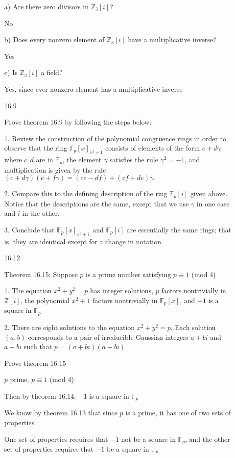 \documentclass[12pt]{article}
\begin{document}
\begin{itemize}
a) Are there zero divisors in $\mathbb{Z}_3[i]$?

No

b) Does every nonzero element of $\mathbb{Z}_3[i]$ have a multiplicative inverse?

Yes

c) Is $\mathbb{Z}_3[i]$ a field?

Yes, since ever nonzero element has a multiplicative inverse

\newpage
\item[16.9]

Prove theorem 16.9 by following the steps below:

1. Review the construction of the polynomial congruence rings in order to observe that the ring $\mathbb{F}_p[x]_{x^2 + 1}$ consists of elements of the form $c+d\gamma$ where $c, d$ are in $\mathbb{F}_p$, the element $\gamma$ satisfies the rule $\gamma^2 = -1$, and multiplication is given by the rule $(c + d\gamma)(e + f\gamma) = (ce - df) + (cf + de)\gamma.$

2. Compare this to the defining description of the ring $\mathbb{F}_p[i]$ given above. Notice that the descriptions are the same, except that we use $\gamma$ in one case and $i$ in the other.

3. Conclude that $\mathbb{F}_p[x]_{x^2+1}$ and $\mathbb{F}_p[i]$ are essentially the same rings; that is, they are identical except for a change in notation.

\newpage
\item[16.12]

	Theorem 16.15: Suppose $p$ is a prime number satisfying $p \equiv 1$ (mod 4)

	1. The equation $x^2 + y^2 = p$ has integer solutions, $p$ factors nontrivially in $\mathbb{Z}[i]$, the polynomial $x^2 + 1$ factors nontrivially in $\mathbb{F}_p[x]$, and $-1$ is a square in $\mathbb{F}_p$

	2. There are eight solutions to the equation $x^2 + y^2 = p$. Each solution $(a,b)$ corresponds to a pair of irreducible Gaussian integers $a + bi$ and $a-bi$ such that $p = (a+bi)(a-bi)$

Prove theorem 16.15

$p$ prime, $p \equiv 1$ (mod 4)

Then by theorem 16.14, $-1$ is a square in $\mathbb{F}_p$

We know by theorem 16.13 that since $p$ is a prime, it has one of two sets of properties

One set of properties requires that $-1$ not be a square in $\mathbb{F}_p$, and the other set of properties requires that $-1$ be a square in $\mathbb{F}_p$


\end{itemize}
\end{document}
